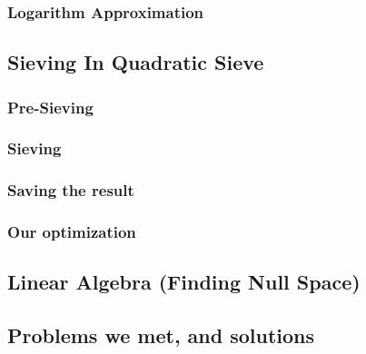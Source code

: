 \documentclass[12pt]{article} %
\begin{document}
\subsubsection{Logarithm Approximation}

\subsection {Sieving In Quadratic Sieve}

\subsubsection {Pre-Sieving}

\subsubsection {Sieving}

\subsubsection {Saving the result}

\subsubsection {Our optimization}

\subsection {Linear Algebra (Finding Null Space) }

\subsection {Problems we met, and solutions}
\end{document}
